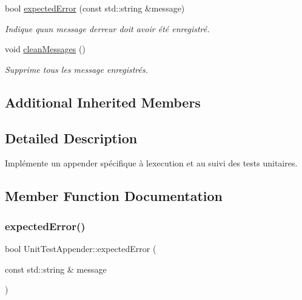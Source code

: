 \begin{DoxyCompactItemize}
bool \hyperlink{classUnitTestAppender_a673b17f2a021ca7cd78971409180061c}{expected\+Error} (const std\+::string \&message)
\begin{DoxyCompactList}\small\item\em Indique qu\textquotesingle{}un message d\textquotesingle{}erreur doit avoir été enregistré. \end{DoxyCompactList}\item 
\mbox{\label{classUnitTestAppender_a7ae813ab0a74967bd584b69531881825}} 
void \hyperlink{classUnitTestAppender_a7ae813ab0a74967bd584b69531881825}{clean\+Messages} ()
\begin{DoxyCompactList}\small\item\em Supprime tous les message enregistrés. \end{DoxyCompactList}\end{DoxyCompactItemize}
\subsection*{Additional Inherited Members}


\subsection{Detailed Description}
Implémente un appender spécifique à l\textquotesingle{}execution et au suivi des tests unitaires. 

\subsection{Member Function Documentation}
\mbox{\label{classUnitTestAppender_a673b17f2a021ca7cd78971409180061c}} 
\subsubsection{\texorpdfstring{expected\+Error()}{expectedError()}}
{\footnotesize\ttfamily bool Unit\+Test\+Appender\+::expected\+Error (\begin{DoxyParamCaption}\item[{const std\+::string \&}]{message }\end{DoxyParamCaption})}



